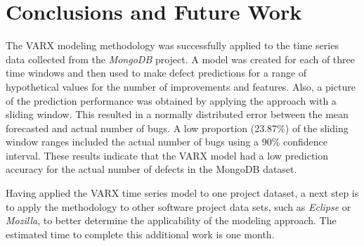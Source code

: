\documentclass[letterpaper]{report}
\begin{document}
\chapter{Conclusions and Future Work}
\label{sec:conclusions}
The VARX modeling methodology was successfully applied to the time series data collected from the \textit{MongoDB} project. A model was created for each of three time windows and then used to make defect predictions for a range of hypothetical values for the number of improvements and features. Also, a picture of the prediction performance was obtained by applying the approach with a sliding window. This resulted in a normally distributed error between the mean forecasted and actual number of bugs. A low proportion (23.87\%) of the sliding window ranges included the actual number of bugs using a 90\% confidence interval. These results indicate that the VARX model had a low prediction accuracy for the actual number of defects in the MongoDB dataset.

Having applied the VARX time series model to one project dataset, a next step is to apply the methodology to other software project data sets, such as \textit{Eclipse} or \textit{Mozilla}, to better determine the applicability of the modeling approach. The estimated time to complete this additional work is one month. 

%
\end{document}
